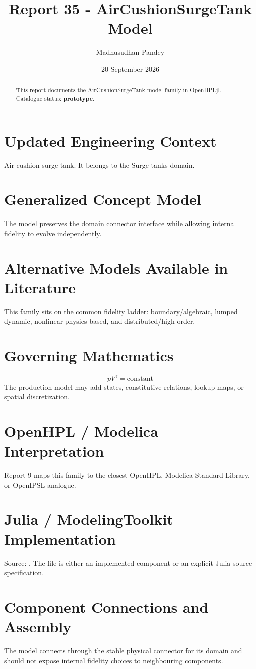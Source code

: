 \documentclass[10pt,a4paper]{article}
\title{Report 35 - AirCushionSurgeTank Model}
\author{Madhusudhan Pandey}
\date{20 September 2026}
\begin{document}
\maketitle
\begin{abstract}This report documents the AirCushionSurgeTank model family in OpenHPLjl. Catalogue status: \textbf{prototype}.\end{abstract}
\section{Updated Engineering Context}Air-cushion surge tank. It belongs to the Surge tanks domain.
\section{Generalized Concept Model}The model preserves the domain connector interface while allowing internal fidelity to evolve independently.
\section{Alternative Models Available in Literature}This family sits on the common fidelity ladder: boundary/algebraic, lumped dynamic, nonlinear physics-based, and distributed/high-order.
\section{Governing Mathematics}\[pV^\gamma=\mathrm{constant}\]The production model may add states, constitutive relations, lookup maps, or spatial discretization.
\section{OpenHPL / Modelica Interpretation}Report 9 maps this family to the closest OpenHPL, Modelica Standard Library, or OpenIPSL analogue.
\section{Julia / ModelingToolkit Implementation}Source: \texttt{}. The file is either an implemented component or an explicit Julia source specification.
\section{Component Connections and Assembly}The model connects through the stable physical connector for its domain and should not expose internal fidelity choices to neighbouring components.
\end{document}
